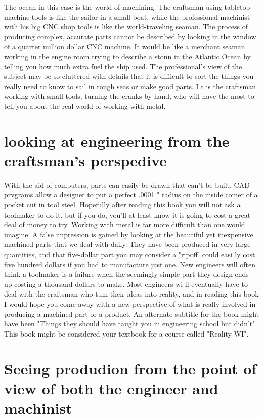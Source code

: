 The ocean in this case is the world of machining.
The craftsman using tabletop machine tools is like
the sailor in a small boat, while the professional
machinist with his big CNC shop tools is like the
world-traveling seaman. The process of producing
complex, accurate parts cannot be described by
looking in the window of a quarter million dollar
CNC machine. It would be like a merchant seaman
working in the engine room trying to describe a
stonn in the Atlantic Ocean by telling you how much
extra fuel the ship used. The professional's view of
the subject may be so cluttered with details that it is
difficult to sort the things you really need to know
to sail in rough seas or make good parts. I t is the
craftsman working with small tools, turning the
cranks by hand, who will have the most to tell you
about the real world of working with metal.

\section{looking at engineering from the craftsman's perspedive}

With the aid of computers, parts can easily be drawn
that can't be built. CAD prvgrams allow a designer
to put a perfect .0001 " radius on the inside comer of
a pocket cut in tool steel. Hopefully after reading
this book you will not ask a toolmaker to do it, but
if you do, you'll at least know it is going to cost a
great deal of money to try. Working with metal is
far more difficult than one would imagine. A false
impression is gained by looking at the beautiful yet
inexpensive machined parts that we deal with daily.
They have been produced in very large quantities,
and that five-dollar part you may consider a "ripoff'
could easi ly cost five hundred dollars if you
had to manufacture just one. New engineers will
often think a toolmaker is a failure when the
seemingly simple part they design ends up costing
a thousand dollars to make. Most engineers wi ll
eventually have to deal with the craftsman who tum
their ideas into reality, and in reading this book I
would hope you come away with a new perspective
of what is really involved in producing a machined
part or a product. An alternate subtitle for the book
might have been "Things they should have taught
you in engineering school but didn't". This book
might be considered your textbook for a course
called "Reality WI".

\section{Seeing produdion from the point of view of both
the engineer and machinist}

